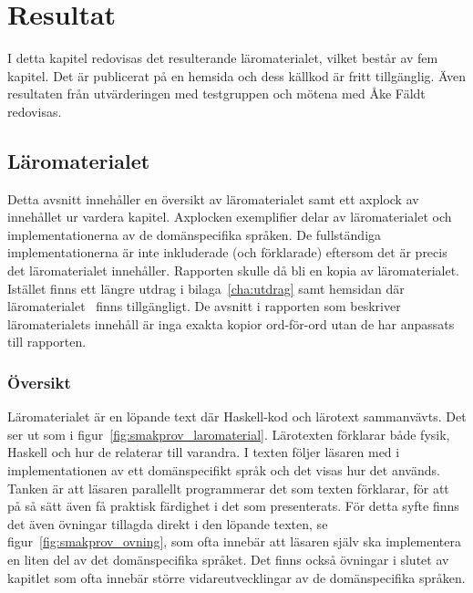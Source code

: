 \chapter{Resultat}

I detta kapitel redovisas det resulterande läromaterialet, vilket består av fem
kapitel. Det är publicerat på en hemsida och dess källkod är fritt tillgänglig.
Även resultaten från utvärderingen med testgruppen och mötena med Åke Fäldt
redovisas.

\section{Läromaterialet}\label{sec:res_laromaterial}

Detta avsnitt innehåller en översikt av läromaterialet samt ett axplock av innehållet ur
vardera kapitel. Axplocken exemplifier delar av läromaterialet och
implementationerna av de domänspecifika språken. De fullständiga implementationerna
är inte inkluderade (och förklarade) eftersom det är precis det läromaterialet
innehåller. Rapporten skulle då bli en kopia av läromaterialet. Istället
finns ett längre utdrag i bilaga~\ref{cha:utdrag} samt hemsidan där
läromaterialet~\cite{LYAP} finns tillgängligt. De avsnitt i rapporten som beskriver läromaterialets innehåll är inga
exakta kopior ord-för-ord utan de har anpassats till
rapporten.

\subsection{Översikt}

Läromaterialet är en löpande text där Haskell-kod och lärotext sammanvävts. Det
ser ut som i figur~\ref{fig:smakprov_laromaterial}. Lärotexten förklarar både fysik, Haskell och hur de relaterar till varandra. I texten följer läsaren med
i implementationen av ett domänspecifikt språk och det visas hur det används.
Tanken är att läsaren parallellt programmerar det som texten förklarar, för att
på så sätt även få praktisk färdighet i det som presenterats. För detta syfte
finns det även övningar tillagda direkt i den löpande texten, se
figur~\ref{fig:smakprov_ovning}, som ofta innebär att läsaren själv ska
implementera en liten del av det domänspecifika språket. Det finns också
övningar i slutet av kapitlet som ofta innebär större vidareutvecklingar av de
domänspecifika språken.

